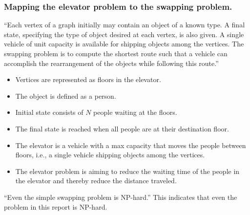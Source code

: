 
\subsubsection{Mapping the elevator problem to the swapping problem.}
“Each vertex of a graph initially may contain an object of a known type. A final state, specifying the type of object desired at each vertex, is also given. A single vehicle of unit capacity is available for shipping objects among the vertices. The swapping problem is to compute the shortest route such that a vehicle can accomplish the rearrangement of the objects while following this route.” \cite{anily1992swapping}

\begin{itemize}
	\item Vertices are represented as floors in the elevator.
	\item The object is defined as a person.
	\item Initial state consists of $ N $ people waiting at the floors.
	\item The final state is reached when all people are at their destination floor.
	\item The elevator is a vehicle with a max capacity that moves the people between floors, i.e., a single vehicle shipping objects among the vertices.
	\item The elevator problem is aiming to reduce the waiting time of the people in the elevator and thereby reduce the distance traveled.
\end{itemize}

“Even the simple swapping problem is NP-hard.” \cite{anily1992swapping} This indicates that even the problem in this report is NP-hard.
